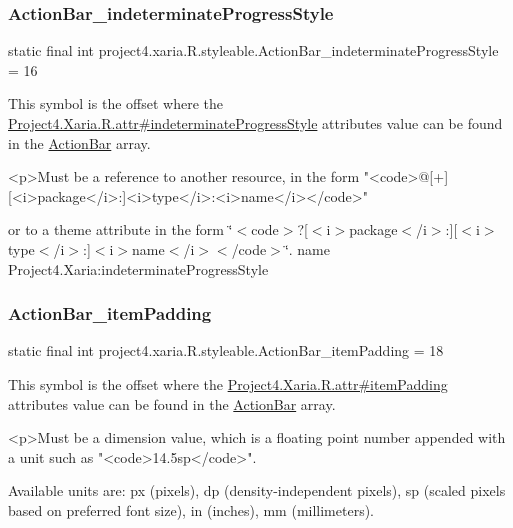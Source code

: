 \subsubsection{\texorpdfstring{Action\+Bar\+\_\+indeterminate\+Progress\+Style}{ActionBar\_indeterminateProgressStyle}}
{\footnotesize\ttfamily static final int project4.\+xaria.\+R.\+styleable.\+Action\+Bar\+\_\+indeterminate\+Progress\+Style = 16\hspace{0.3cm}{\ttfamily [static]}}

This symbol is the offset where the \hyperlink{}{Project4.\+Xaria.\+R.\+attr\#indeterminate\+Progress\+Style} attribute\textquotesingle{}s value can be found in the \hyperlink{classproject4_1_1xaria_1_1R_1_1styleable_accb530194c58ee3abb15587da8869e99}{Action\+Bar} array.

\begin{DoxyVerb}      <p>Must be a reference to another resource, in the form "<code>@[+][<i>package</i>:]<i>type</i>:<i>name</i></code>"
\end{DoxyVerb}
 or to a theme attribute in the form \char`\"{}$<$code$>$?\mbox{[}$<$i$>$package$<$/i$>$\+:\mbox{]}\mbox{[}$<$i$>$type$<$/i$>$\+:\mbox{]}$<$i$>$name$<$/i$>$$<$/code$>$\char`\"{}.  name Project4.\+Xaria\+:indeterminate\+Progress\+Style \mbox{\label{classproject4_1_1xaria_1_1R_1_1styleable_afead372bec08fa28b16df291eceff099}} 
\subsubsection{\texorpdfstring{Action\+Bar\+\_\+item\+Padding}{ActionBar\_itemPadding}}
{\footnotesize\ttfamily static final int project4.\+xaria.\+R.\+styleable.\+Action\+Bar\+\_\+item\+Padding = 18\hspace{0.3cm}{\ttfamily [static]}}

This symbol is the offset where the \hyperlink{}{Project4.\+Xaria.\+R.\+attr\#item\+Padding} attribute\textquotesingle{}s value can be found in the \hyperlink{classproject4_1_1xaria_1_1R_1_1styleable_accb530194c58ee3abb15587da8869e99}{Action\+Bar} array.

\begin{DoxyVerb}      <p>Must be a dimension value, which is a floating point number appended with a unit such as "<code>14.5sp</code>".
\end{DoxyVerb}
 Available units are\+: px (pixels), dp (density-\/independent pixels), sp (scaled pixels based on preferred font size), in (inches), mm (millimeters). 

